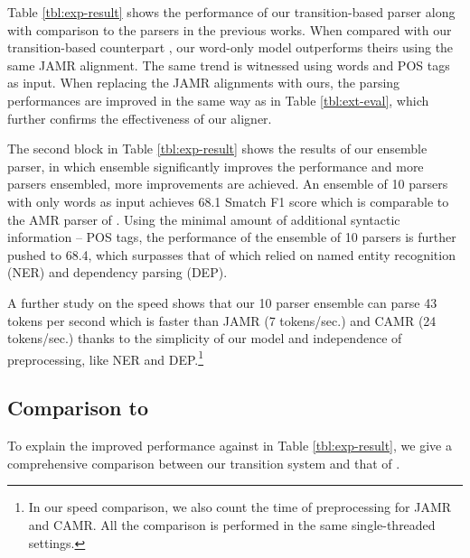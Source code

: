 \documentclass[11pt,a4paper]{article}
\begin{document}
Table \ref{tbl:exp-result} shows the performance of our transition-based parser
along with comparison to the parsers in the previous works.
When compared with our transition-based counterpart
\citep{ballesteros-alonaizan:2017:EMNLP2017}, our word-only
model outperforms theirs  using the same JAMR alignment.
The same trend is witnessed using words and POS tags as input.
When replacing the JAMR alignments with ours,
the parsing performances are improved in the same way as in Table \ref{tbl:ext-eval},
which further confirms the effectiveness of our aligner.


The second block in Table \ref{tbl:exp-result} shows the results of our ensemble parser,
in which ensemble significantly improves the performance and more parsers ensembled, more improvements are achieved.
An ensemble of 10 parsers with only words as input
achieves 68.1 Smatch F1 score which is comparable to the 
AMR parser of \citet{wang-xue:2017:EMNLP2017}.
Using the minimal amount of additional syntactic information -- POS tags,
the performance of the ensemble of 10 parsers
is further pushed to 68.4, which surpasses that of \citet{wang-xue:2017:EMNLP2017} 
which relied on named entity recognition (NER) and dependency parsing (DEP).

A further study on the speed shows that our 10 parser ensemble
can parse 43 tokens per second which
is faster than JAMR (7 tokens/sec.) and CAMR (24 tokens/sec.)
thanks to the simplicity of our model and independence of preprocessing,
like NER and DEP.\footnote{In our speed comparison, we also count the time of preprocessing for JAMR and CAMR. 
	All the comparison is performed in the same single-threaded settings.}

\subsection{Comparison to \citet{ballesteros-alonaizan:2017:EMNLP2017}}\label{sec:comp-ba17}

To explain the improved performance against \citet{ballesteros-alonaizan:2017:EMNLP2017} in Table \ref{tbl:exp-result},
we give a comprehensive comparison between
our transition system and that of \citet{ballesteros-alonaizan:2017:EMNLP2017}.
\end{document}
